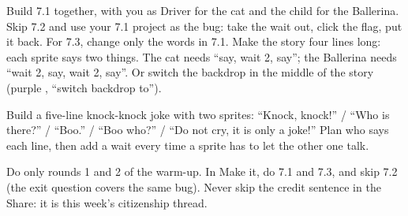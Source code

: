 \begin{differentiation}
\supportpath Build 7.1 together, with you as Driver for the cat and the child for the Ballerina. Skip 7.2 and use your 7.1 project as the bug: take the wait out, click the flag, put it back. For 7.3, change only the words in 7.1.
\extensionpath Make the story four lines long: each sprite says two things. The cat needs \enquote{say, wait 2, say}; the Ballerina needs \enquote{wait 2, say, wait 2, say}. Or switch the backdrop in the middle of the story (purple , \enquote{switch backdrop to}).
\end{differentiation}

\begin{stretchchallenge}
Build a five-line knock-knock joke with two sprites: \enquote{Knock, knock!} / \enquote{Who is there?} / \enquote{Boo.} / \enquote{Boo who?} / \enquote{Do not cry, it is only a joke!} Plan who says each line, then add a wait every time a sprite has to let the other one talk.
\end{stretchchallenge}

\begin{teachernote}
Do only rounds 1 and 2 of the warm-up. In Make it, do 7.1 and 7.3, and skip 7.2 (the exit question covers the same bug). Never skip the credit sentence in the Share: it is this week's citizenship thread.
\end{teachernote}
